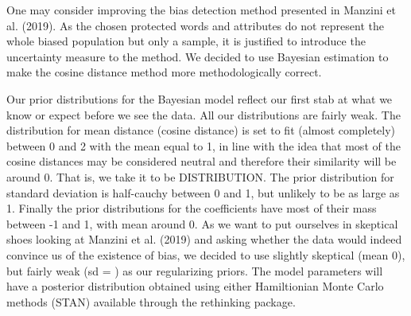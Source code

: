 \documentclass[10pt,dvipsnames,enabledeprecatedfontcommands]{scrartcl}
\begin{document}
One may consider improving the bias detection method presented in
Manzini et al. (2019). As the chosen protected words and attributes do
not represent the whole biased population but only a sample, it is
justified to introduce the uncertainty measure to the method. We decided
to use Bayesian estimation to make the cosine distance method more
methodologically correct.

Our prior distributions for the Bayesian model reflect our first stab at
what we know or expect before we see the data. All our distributions are
fairly weak. The distribution for mean distance (cosine distance) is set
to fit (almost completely) between 0 and 2 with the mean equal to 1, in
line with the idea that most of the cosine distances may be considered
neutral and therefore their similarity will be around 0. That is, we
take it to be DISTRIBUTION. The prior distribution for standard
deviation is half-cauchy between 0 and 1, but unlikely to be as large as
1. Finally the prior distributions for the coefficients have most of
their mass between -1 and 1, with mean around 0. As we want to put
ourselves in skeptical shoes looking at Manzini et al. (2019) and asking
whether the data would indeed convince us of the existence of bias, we
decided to use slightly skeptical (mean 0), but fairly weak (sd = ) as
our regularizing priors. The model parameters will have a posterior
distribution obtained using either Hamiltionian Monte Carlo methods
(STAN) available through the rethinking package.
\end{document}
